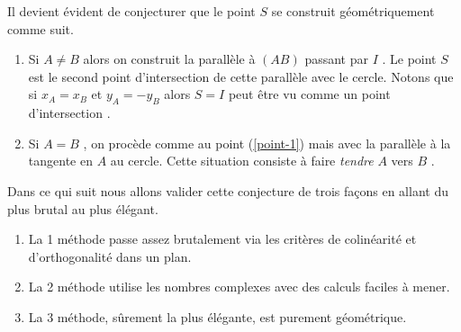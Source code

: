 Il devient évident de conjecturer que le point $S$ se construit géométriquement comme suit.

\begin{enumerate}
	\item \label{point-1} Si $A \neq B$ alors on construit la parallèle à $(AB)$ passant par $I$ . Le point $S$ est le second point d'intersection de cette parallèle avec le cercle.
	Notons que si $x_A = x_B$ et $y_A = -y_B$ alors $S = I$ peut être vu comme un point d'intersection .

	\item Si $A = B$ , on procède comme au point (\ref{point-1}) mais avec la parallèle à la tangente en $A$ au cercle. Cette situation consiste à faire \emph{\og tendre \fg} $A$ vers $B$ .
\end{enumerate}


\medskip

Dans ce qui suit nous allons valider cette conjecture de trois façons en allant du plus brutal au plus élégant.

\begin{enumerate}
	\item La 1\iere{} méthode passe assez brutalement via les critères de colinéarité et d'orthogonalité dans un plan.
	
	\item La 2\ieme{} méthode utilise les nombres complexes avec des calculs faciles à mener.
	
	\item La 3\ieme{} méthode, sûrement la plus élégante, est purement géométrique.
\end{enumerate}

